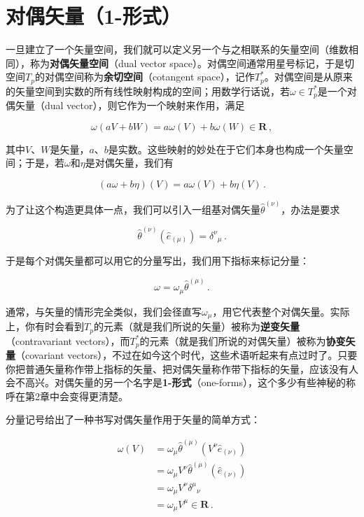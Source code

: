 \section{对偶矢量（1-形式）}

一旦建立了一个矢量空间，我们就可以定义另一个与之相联系的矢量空间（维数相同），称为\textbf{对偶矢量空间}（dual vector space）。对偶空间通常用星号标记，于是切空间$T_p$的对偶空间称为\textbf{余切空间}（cotangent space），记作$T_p^{*}$。对偶空间是从原来的矢量空间到实数的所有线性映射构成的空间；用数学行话说，若$\omega\in T_p^{*}$是一个对偶矢量（dual vector），则它作为一个映射来作用，满足

\begin{equation*}
\omega(aV+bW)=a\omega(V)+b\omega(W)\in\mathbf{R}\,,
\tag{1.44}
\end{equation*}

其中$V$、$W$是矢量，$a$、$b$是实数。这些映射的妙处在于它们本身也构成一个矢量空间；于是，若$\omega$和$\eta$是对偶矢量，我们有

\begin{equation*}
(a\omega+b\eta)(V)=a\omega(V)+b\eta(V)\,.
\tag{1.45}
\end{equation*}

为了让这个构造更具体一点，我们可以引入一组基对偶矢量$\hat{\theta}^{(\nu)}$，办法是要求

\begin{equation*}
\hat{\theta}^{(\nu)}(\hat{e}_{(\mu)})=\delta^{\nu}{}_{\mu}\,.
\tag{1.46}
\end{equation*}

于是每个对偶矢量都可以用它的分量写出，我们用下指标来标记分量：

\begin{equation*}
\omega=\omega_{\mu}\hat{\theta}^{(\mu)}\,.
\tag{1.47}
\end{equation*}

通常，与矢量的情形完全类似，我们会径直写$\omega_{\mu}$，用它代表整个对偶矢量。实际上，你有时会看到$T_p$的元素（就是我们所说的矢量）被称为\textbf{逆变矢量}（contravariant vectors），而$T_p^{*}$的元素（就是我们所说的对偶矢量）被称为\textbf{协变矢量}（covariant vectors），不过在如今这个时代，这些术语听起来有点过时了。只要你把普通矢量称作带上指标的矢量、把对偶矢量称作带下指标的矢量，应该没有人会不高兴。对偶矢量的另一个名字是\textbf{1-形式}（one-forms），这个多少有些神秘的称呼在第2章中会变得更清楚。

分量记号给出了一种书写对偶矢量作用于矢量的简单方式：

\begin{align*}
\omega(V)&=\omega_{\mu}\hat{\theta}^{(\mu)}(V^{\nu}\hat{e}_{(\nu)})\\
&=\omega_{\mu}V^{\nu}\hat{\theta}^{(\mu)}(\hat{e}_{(\nu)})\\
&=\omega_{\mu}V^{\nu}\delta^{\mu}{}_{\nu}\\
&=\omega_{\mu}V^{\mu}\in\mathbf{R}\,.
\tag{1.48}
\end{align*}

